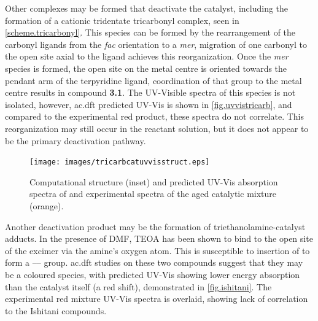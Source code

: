 Other complexes may be formed that deactivate the catalyst, including the formation of a cationic tridentate tricarbonyl complex, seen in \autoref{scheme.tricarbonyl}. This species can be formed by the rearrangement of the carbonyl ligands from the \textit{fac} orientation to a \textit{mer}, migration of one carbonyl to the open site axial to the ligand achieves this reorganization. Once the \textit{mer} species is formed, the open site on the metal centre is oriented towards the pendant arm of the terpyridine ligand, coordination of that group to the metal centre results in compound \textbf{3.1}. The UV-Visible spectra of this species is not isolated, however, \gls{ac.dft} predicted UV-Vis is shown in \autoref{fig.uvvistricarb}, and compared to the experimental red product, these spectra do not correlate. This reorganization may still occur in the reactant solution, but it does not appear to be the primary deactivation pathway.

\begin{figure}[!htbp]
 \begin{center}
  \texttt{[image: images/tricarbcatuvvisstruct.eps]}
 \end{center}
 \caption[Structure and absorption spectra of proposed .]{Computational structure (inset) and predicted UV-Vis absorption spectra of  and experimental spectra of the aged catalytic mixture (orange).}
 \label{fig.uvvistricarb}
\end{figure}

Another deactivation product may be the formation of triethanolamine-catalyst adducts\autocite{morimoto2013}. In the presence of DMF, TEOA has been shown to bind to the open site of the excimer via the amine's oxygen atom. This is susceptible to insertion of  to form a ---- group. \Gls{ac.dft} studies on these two compounds suggest that they may be a coloured species, with predicted UV-Vis showing lower energy absorption than the catalyst itself (a red shift), demonstrated in \autoref{fig.ishitani}. The experimental red mixture UV-Vis spectra is overlaid, showing lack of correlation to the Ishitani compounds.

